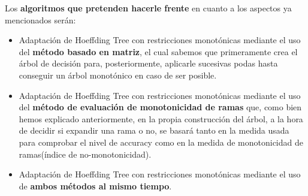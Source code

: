 Los \textbf{algoritmos que pretenden hacerle frente} en cuanto a los aspectos ya mencionados serán:
\begin{itemize}
	\item Adaptación de Hoeffding Tree con restricciones monotónicas mediante el uso del \textbf{método basado en matriz}, el cual sabemos que primeramente crea el árbol de decisión para, posteriormente, aplicarle sucesivas podas hasta conseguir un árbol monotónico en caso de ser posible.
	\item Adaptación de Hoeffding Tree con restricciones monotónicas mediante el uso del \textbf{método de evaluación de monotonicidad de ramas} que, como bien hemos explicado anteriormente, en la propia construcción del árbol, a la hora de decidir si expandir una rama o no, se basará tanto en la medida usada para comprobar el nivel de accuracy como en la medida de monotonicidad de ramas(índice de no-monotonicidad).
	\item Adaptación de Hoeffding Tree con restricciones monotónicas mediante el uso de\textbf{ ambos métodos al mismo tiempo}.
\end{itemize}











\newpage


